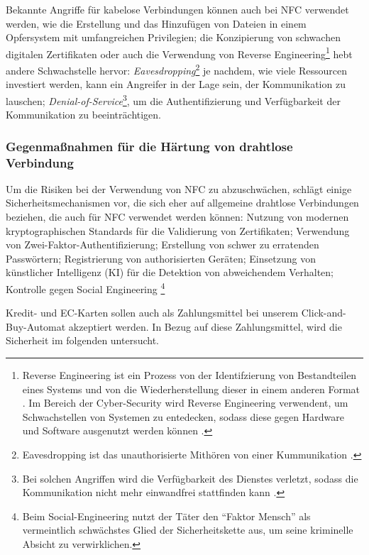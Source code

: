 Bekannte Angriffe für kabelose Verbindungen können auch bei NFC verwendet werden\cite{refip:NYRS}, wie die
Erstellung und das Hinzufügen von Dateien in einem Opfersystem mit umfangreichen Privilegien; die Konzipierung
von schwachen digitalen Zertifikaten oder auch die Verwendung von Reverse Engineering\footnote{Reverse
Engineering ist ein Prozess von der Identifzierung von Bestandteilen eines Systems und von die Wiederherstellung 
dieser in einem anderen Format \cite{refart:CHRE}. Im Bereich der Cyber-Security wird Reverse Engineering 
verwendent, um Schwachstellen von Systemen zu entedecken, sodass diese gegen Hardware und Software ausgenutzt werden können \cite{refip:CMBM}.} 
\cite{refart:ALSI} hebt andere Schwachstelle hervor: 
\textit{Eavesdropping}\footnote{Eavesdropping ist das unauthorisierte Mithören von einer Kummunikation \cite{refbook:SWIS}.}
je nachdem, wie viele Ressourcen investiert werden, kann ein Angreifer in der Lage sein, der Kommunikation
zu lauschen; \textit{Denial-of-Service}\footnote{Bei solchen Angriffen wird die Verfügbarkeit des Dienstes verletzt, 
sodass die Kommunikation nicht mehr einwandfrei stattfinden kann \cite{refbook:SWIS}.}, um die Authentifizierung
und Verfügbarkeit der Kommunikation zu beeinträchtigen.


\subsubsection{Gegenmaßnahmen für die Härtung von drahtlose Verbindung}

Um die Risiken bei der Verwendung von NFC zu abzuschwächen, schlägt \cite{refip:NYRS} einige Sicherheitsmechanismen vor, 
die sich eher auf allgemeine drahtlose Verbindungen beziehen, die auch für NFC verwendet werden können: Nutzung von modernen 
kryptographischen Standards für die Validierung von Zertifikaten; Verwendung von Zwei-Faktor-Authentifizierung; Erstellung
von schwer zu erratenden Passwörtern; Registrierung von authorisierten Geräten; Einsetzung von künstlicher Intelligenz 
(KI) für die Detektion von abweichendem Verhalten; Kontrolle gegen Social Engineering \footnote{Beim Social-Engineering
nutzt der Täter den ``Faktor Mensch'' als vermeintlich schwächstes Glied der Sicherheitskette aus, um seine kriminelle
 Absicht zu verwirklichen.\cite{booklet:BSSE}}


 Kredit- und EC-Karten sollen auch als Zahlungsmittel bei unserem Click-and-Buy-Automat akzeptiert werden. 
In Bezug auf diese Zahlungsmittel, wird die Sicherheit im folgenden untersucht.

